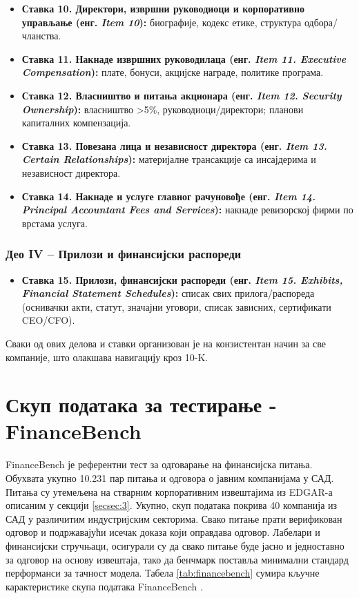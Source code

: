 \begin{itemize}
\item \textbf{Ставка 10. Директори, извршни руководиоци и корпоративно управљање (енг. \textit{Item 10}):} биографије, кодекс етике, структура одбора/чланства.

\item \textbf{Ставка 11. Накнаде извршних руководилаца (енг. \textit{Item 11. Executive Compensation}):} плате, бонуси, акцијске награде, политике програма.

\item \textbf{Ставка 12. Власништво и питања акционара (енг. \textit{Item 12. Security Ownership}):} власништво >5\%, руководиоци/директори; планови капиталних компензација.

\item \textbf{Ставка 13. Повезана лица и независност директора (енг. \textit{Item 13. Certain Relationships}):} материјалне трансакције са инсајдерима и независност директора.

\item \textbf{Ставка 14. Накнаде и услуге главног рачуновође (енг. \textit{Item 14. Principal Accountant Fees and Services}):} накнаде ревизорској фирми по врстама услуга.
\end{itemize}

\subsubsection{Део IV – Прилози и финансијски распореди}

\begin{itemize}
\item \textbf{Ставка 15. Прилози, финансијски распореди (енг. \textit{Item 15. Exhibits, Financial Statement Schedules}):} списак свих прилога/распореда (оснивачки акти, статут, значајни уговори, списак зависних, сертификати CEO/CFO).
\end{itemize}

Сваки од ових делова и ставки организован је на конзистентан начин за све компаније, што олакшава навигацију кроз 10-K.

\section{Скуп података за тестирање - FinanceBench}

FinanceBench је референтни тест за одговарање на финансијска питања. Обухвата укупно 10.231 пар питања и одговора о јавним компанијама у САД. Питања су утемељена на стварним корпоративним извештајима из EDGAR-а описаним у секцији \ref{secsec:3}. Укупно, скуп података покрива 40 компанија из САД у различитим индустријским секторима. Свако питање прати верификован одговор и подржавајући исечак доказа који оправдава одговор. Лабелари и финансијски стручњаци, осигурали су да свако питање буде јасно и једноставно за одговор на основу извештаја, тако да бенчмарк поставља минимални стандард перформанси за тачност модела. Табела \ref{tab:financebench} сумира кључне карактеристике скупа података FinanceBench \cite{islam_financebench_2023}.
\newline

